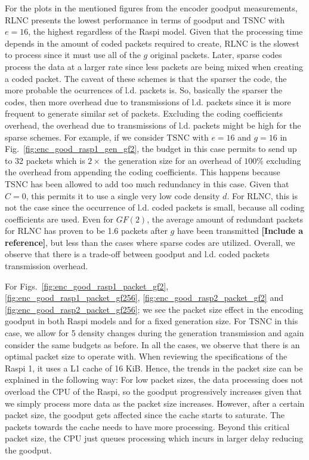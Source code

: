 For the plots in the mentioned figures from the encoder goodput measurements,
\ac{RLNC} presents the lowest performance in terms of goodput and
\ac{TSNC} with $e = 16$, the highest regardless of the \ac{Raspi} model.
Given that the processing time depends in the amount of coded packets
required to create, \ac{RLNC} is the slowest to process since it must
use all of the $g$ original packets. Later, sparse codes process the data
at a larger rate since less packets are being mixed when creating a
coded packet. The caveat of these schemes is that the sparser the code,
the more probable the ocurrences of \ac{l.d.} packets is. So, basically
the sparser the codes, then more overhead due to transmissions of \ac{l.d.}
packets since it is more frequent to generate similar set of packets.
Excluding the coding coefficients overhead, the overhead due to
transmissions of \ac{l.d.} packets might be high for the sparse schemes.
For example, if we consider \ac{TSNC} with $e = 16$ and $g = 16$
in Fig.~\ref{fig:enc_good_rasp1_gen_gf2}, the budget in this case permits
to send up to 32 packets which is $2\times$ the generation
size for an overhead of $100\%$ excluding the overhead from appending
the coding coefficients. This happens because \ac{TSNC}
has been allowed to add too much redundancy in this case. Given that $C=0$,
this permits it to use a single very low code density $d$. For \ac{RLNC},
this is not the case since the occurrence of \ac{l.d.} coded packets is
small, because all coding coefficients are used. Even for $GF(2)$, the
average amount of redundant packets for \ac{RLNC} has proven to be 1.6
packets after $g$ have been transmitted \textbf{[Include a reference]},
but less than the cases where sparse codes are utilized. Overall, we
observe that there is a trade-off between goodput and \ac{l.d.} coded
packets transmission overhead.

For Figs.~\ref{fig:enc_good_rasp1_packet_gf2},
\ref{fig:enc_good_rasp1_packet_gf256}, \ref{fig:enc_good_rasp2_packet_gf2}
and \ref{fig:enc_good_rasp2_packet_gf256}; we see the packet
size effect in the encoding goodput in both \ac{Raspi} models and for
a fixed generation size. For \ac{TSNC} in this case, we allow for 5 density
changes during the generation transmission and again consider the same
budgets as before. In all the cases, we observe that there is an
optimal packet size to operate with. When reviewing the specifications
of the \ac{Raspi} 1, it uses a L1 cache of 16 KiB. Hence, the trends
in the packet size can be explained in the following way: For low packet
sizes, the data processing does not overload the \ac{CPU} of the
\ac{Raspi}, so the goodput progressively increases given that we simply
process more data as the packet size increases. However, after a certain
packet size, the goodput gets affected since the cache starts to saturate.
The packets towards the cache needs to have more processing. Beyond this
critical packet size, the \ac{CPU} just queues processing which incurs in
larger delay reducing the goodput.

